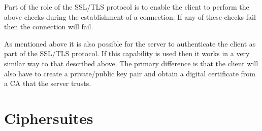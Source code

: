Part of the role of the SSL/TLS protocol is to enable the client to perform the 
above checks during the establishment of a connection. If any of these
checks fail then the connection will fail.

As mentioned above it is also possible for the server to authenticate the 
client as part of the SSL/TLS protocol. If this capability is used then it works
in a very similar way  to that described above. The primary difference is that
the client will also have to create a private/public key pair and obtain a
digital certificate from a CA that the server trusts. 

\section{Ciphersuites}

